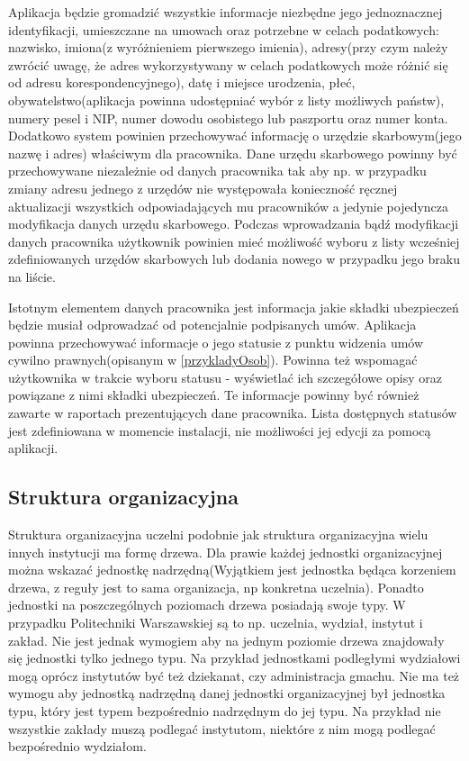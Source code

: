 Aplikacja będzie gromadzić wszystkie informacje niezbędne jego jednoznacznej identyfikacji, umieszczane na umowach oraz potrzebne w celach podatkowych: nazwisko, imiona(z wyróżnieniem pierwszego imienia), adresy(przy czym należy zwrócić uwagę, że adres wykorzystywany w celach podatkowych może różnić się od adresu korespondencyjnego), datę i miejsce urodzenia, płeć, obywatelstwo(aplikacja powinna udostępniać wybór z listy możliwych państw), numery pesel i NIP, numer dowodu osobistego lub paszportu oraz numer konta. Dodatkowo system powinien przechowywać informację o urzędzie skarbowym(jego nazwę i adres) właściwym dla pracownika. Dane urzędu skarbowego powinny być przechowywane niezależnie od danych pracownika tak aby np. w przypadku zmiany adresu jednego z urzędów nie występowała konieczność ręcznej aktualizacji wszystkich odpowiadających mu pracowników a jedynie pojedyncza modyfikacja danych urzędu skarbowego. Podczas wprowadzania bądź modyfikacji danych pracownika użytkownik powinien mieć możliwość wyboru z listy wcześniej zdefiniowanych urzędów skarbowych lub dodania nowego w przypadku jego braku na liście.

Istotnym elementem danych pracownika jest informacja jakie składki ubezpieczeń będzie musiał odprowadzać od potencjalnie podpisanych umów. Aplikacja powinna przechowywać informacje o jego statusie z punktu widzenia umów cywilno prawnych(opisanym w \ref{przykladyOsob}). Powinna też wspomagać użytkownika w trakcie wyboru statusu - wyświetlać ich szczegółowe opisy oraz powiązane z nimi składki ubezpieczeń. Te informacje powinny być również zawarte w raportach prezentujących dane pracownika. Lista dostępnych statusów jest zdefiniowana w momencie instalacji, nie możliwości jej edycji za pomocą aplikacji.

\subsection[Struktura organizacyjna][Struktura organizacyjna]{Struktura organizacyjna}
Struktura organizacyjna uczelni podobnie jak struktura organizacyjna wielu innych instytucji ma formę drzewa. Dla prawie każdej jednostki organizacyjnej można wskazać jednostkę nadrzędną(Wyjątkiem jest jednostka będąca korzeniem drzewa, z reguły jest to sama organizacja, np konkretna uczelnia). Ponadto jednostki na poszczególnych poziomach drzewa posiadają swoje typy. W przypadku Politechniki Warszawskiej są to np. uczelnia, wydział, instytut i zakład. Nie jest jednak wymogiem aby na jednym poziomie drzewa znajdowały się jednostki tylko jednego typu. Na przykład jednostkami podległymi wydziałowi mogą oprócz instytutów być też dziekanat, czy administracja gmachu. Nie ma też wymogu aby jednostką nadrzędną danej jednostki organizacyjnej był jednostka typu, który jest typem bezpośrednio nadrzędnym do jej typu. Na przykład nie wszystkie zakłady muszą podlegać instytutom, niektóre z nim mogą podlegać bezpośrednio wydziałom. 

